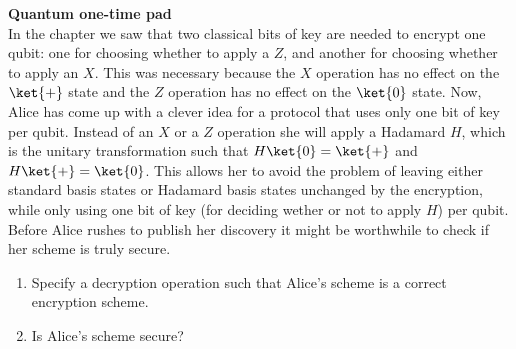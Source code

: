 \begin{exercises}
\item {\bf Quantum one-time pad}\\
In the chapter we saw that two classical bits of key are needed to encrypt one qubit: one for choosing whether to apply a $Z$, and another for choosing whether to apply an $X$. This was necessary because the $X$ operation has no effect on the $\ket{+}$ state and the $Z$ operation has no effect on the $\ket{0}$ state. Now, Alice has come up with a clever idea for a protocol that uses only one bit of key per qubit. Instead of an $X$ or a $Z$ operation she will apply a Hadamard $H$, which is the unitary transformation such that $H\ket{0} = \ket{+}$ and $H\ket{+} = \ket{0}$. This allows her to avoid the problem of leaving either standard basis states or Hadamard basis states unchanged by the encryption, while only using one bit of key (for deciding wether or not to apply $H$) per qubit. Before Alice rushes to publish her discovery it might be worthwhile to check if her scheme is truly secure.
\begin{enumerate}
\item Specify a decryption operation such that Alice's scheme is a correct encryption scheme. 
\item Is Alice's scheme secure? 
\end{enumerate}



\end{exercises}
